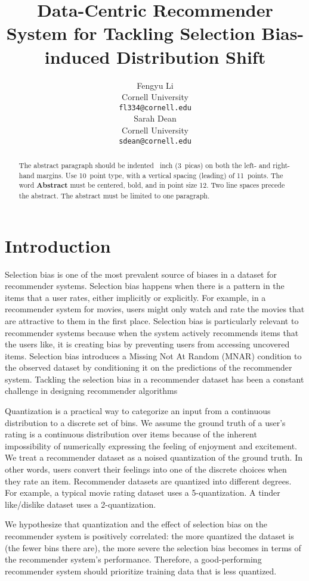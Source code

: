 \documentclass{article}
\title{Data-Centric Recommender System for Tackling Selection Bias-induced Distribution Shift}
\author{%
  Fengyu Li \\
  Cornell University\\
  \texttt{fl334@cornell.edu} \\
  \And
  Sarah Dean \\
  Cornell University \\
  \texttt{sdean@cornell.edu} \\
}
\begin{document}
\maketitle


\begin{abstract}
  The abstract paragraph should be indented ~inch (3~picas) on
  both the left- and right-hand margins. Use 10~point type, with a vertical
  spacing (leading) of 11~points.  The word \textbf{Abstract} must be centered,
  bold, and in point size 12. Two line spaces precede the abstract. The abstract
  must be limited to one paragraph.
\end{abstract}

\section{Introduction}
Selection bias is one of the most prevalent source of biases in a dataset for recommender systems. Selection bias happens when there is a pattern in the items that a user rates, either implicitly or explicitly. For example, in a recommender system for movies, users might only watch and rate the movies that are attractive to them in the first place. Selection bias is particularly relevant to recommender systems because when the system actively recommends items that the users like, it is creating bias by preventing users from accessing uncovered items. Selection bias introduces a Missing Not At Random (MNAR) condition to the observed dataset by conditioning it on the predictions of the recommender system. Tackling the selection bias in a recommender dataset has been a constant challenge in designing recommender algorithms

Quantization is a practical way to categorize an input from a continuous distribution to a discrete set of bins. We assume the ground truth of a user's rating is a continuous distribution over items because of the inherent impossibility of numerically expressing the feeling of enjoyment and excitement. We treat a recommender dataset as a noised quantization of the ground truth. In other words, users convert their feelings into one of the discrete choices when they rate an item. Recommender datasets are quantized into different degrees. For example, a typical movie rating dataset uses a 5-quantization. A tinder like/dislike dataset uses a 2-quantization.

We hypothesize that quantization and the effect of selection bias on the recommender system is positively correlated: the more quantized the dataset is (the fewer bins there are), the more severe the selection bias becomes in terms of the recommender system's performance. Therefore, a good-performing recommender system should prioritize training data that is less quantized. 
\end{document}
